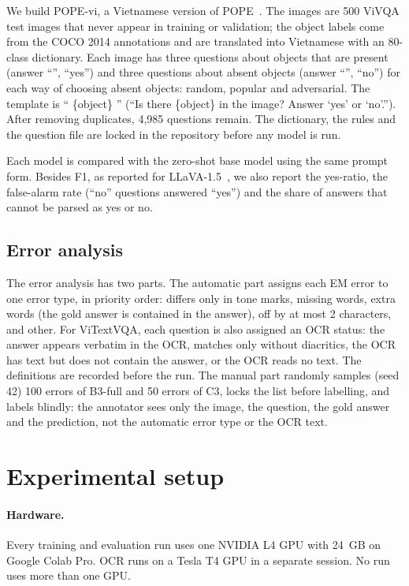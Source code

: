 We build POPE-vi, a Vietnamese version of POPE~\cite{li2023pope}. The images are
500 ViVQA test images that never appear in training or validation; the object labels come
from the COCO 2014 annotations and are translated into Vietnamese with an 80-class
dictionary. Each image has three questions about objects that are present (answer
``'', ``yes'') and three questions about absent objects (answer ``'',
``no'') for each way of choosing absent objects: random, popular and adversarial. The
template is `` \{object\} ''
(``Is there \{object\} in the image? Answer `yes' or `no'.''). After removing duplicates,
4,985 questions remain. The dictionary, the rules and the question file are locked in the
repository before any model is run.

Each model is compared with the zero-shot base model using the same prompt form. Besides
F1, as reported for LLaVA-1.5~\cite{liu2024llava15}, we also report the yes-ratio,
the false-alarm rate (``no'' questions answered ``yes'') and the share of answers that
cannot be parsed as yes or no.

\subsection{Error analysis}
\label{sec:met-error}

The error analysis has two parts. The automatic part assigns each EM error to one error
type, in priority order: differs only in tone marks, missing words, extra words (the gold
answer is contained in the answer), off by at most 2 characters, and other. For ViTextVQA,
each question is also assigned an OCR status: the answer appears verbatim in the OCR,
matches only without diacritics, the OCR has text but does not contain the answer, or the
OCR reads no text. The definitions are recorded before the run. The manual part randomly
samples (seed 42) 100 errors of B3-full and 50 errors of C3, locks the list before
labelling, and labels blindly: the annotator sees only the image, the question, the gold
answer and the prediction, not the automatic error type or the OCR text.

\section{Experimental setup}
\label{sec:met-setup}

\paragraph{Hardware.} Every training and evaluation run uses one NVIDIA L4 GPU with 24~GB
on Google Colab Pro. OCR runs on a Tesla T4 GPU in a separate session. No run uses more
than one GPU.

